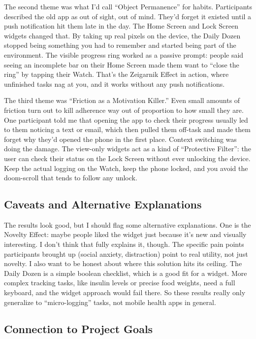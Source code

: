 \documentclass[10pt,twocolumn]{article}
\begin{document}
The second theme was what I'd call ``Object Permanence'' for habits. Participants described the old app as out of sight, out of mind. They'd forget it existed until a push notification hit them late in the day. The Home Screen and Lock Screen widgets changed that. By taking up real pixels on the device, the Daily Dozen stopped being something you had to remember and started being part of the environment. The visible progress ring worked as a passive prompt: people said seeing an incomplete bar on their Home Screen made them want to ``close the ring'' by tapping their Watch. That's the Zeigarnik Effect in action, where unfinished tasks nag at you,\cite{ZeigarnikEffect} and it works without any push notifications.

The third theme was ``Friction as a Motivation Killer.''\cite{LiPersonalInformatics} Even small amounts of friction turn out to kill adherence way out of proportion to how small they are. One participant told me that opening the app to check their progress usually led to them noticing a text or email, which then pulled them off-task and made them forget why they'd opened the phone in the first place. Context switching was doing the damage. The view-only widgets act as a kind of ``Protective Filter'': the user can check their status on the Lock Screen without ever unlocking the device. Keep the actual logging on the Watch, keep the phone locked, and you avoid the doom-scroll that tends to follow any unlock.

\subsection{Caveats and Alternative Explanations}

The results look good, but I should flag some alternative explanations. One is the Novelty Effect: maybe people liked the widget just because it's new and visually interesting. I don't think that fully explains it, though. The specific pain points participants brought up (social anxiety, distraction) point to real utility, not just novelty. I also want to be honest about where this solution hits its ceiling. The Daily Dozen is a simple boolean checklist, which is a good fit for a widget.\cite{GregerHowNotToDie} More complex tracking tasks, like insulin levels or precise food weights, need a full keyboard, and the widget approach would fail there. So these results really only generalize to ``micro-logging'' tasks, not mobile health apps in general.

\subsection{Connection to Project Goals}
\end{document}
